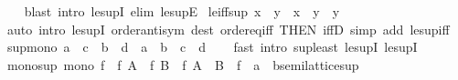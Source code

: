 \begin{isabellebody}
%
\isadelimproof
\ \ %
\endisadelimproof
%
\isatagproof
{}\isamarkupfalse%
\ {\isacharparenleft}{\kern0pt}blast\ intro{\isacharcolon}{\kern0pt}\ le{\isacharunderscore}{\kern0pt}supI\ elim{\isacharcolon}{\kern0pt}\ le{\isacharunderscore}{\kern0pt}supE{\isacharparenright}{\kern0pt}%
\endisatagproof
{\isafoldproof}%
%
\isadelimproof
\isanewline
%
\endisadelimproof
\isanewline
{}\isamarkupfalse%
\ le{\isacharunderscore}{\kern0pt}iff{\isacharunderscore}{\kern0pt}sup{\isacharcolon}{\kern0pt}\ {\isachardoublequoteopen}x\ {\isasymle}\ y\ {\isasymlongleftrightarrow}\ x\ {\isasymsqunion}\ y\ {\isacharequal}{\kern0pt}\ y{\isachardoublequoteclose}\isanewline
%
\isadelimproof
\ \ %
\endisadelimproof
%
\isatagproof
{}\isamarkupfalse%
\ {\isacharparenleft}{\kern0pt}auto\ intro{\isacharcolon}{\kern0pt}\ le{\isacharunderscore}{\kern0pt}supI{}\ order{\isachardot}{\kern0pt}antisym\ dest{\isacharcolon}{\kern0pt}\ order{\isachardot}{\kern0pt}eq{\isacharunderscore}{\kern0pt}iff\ {\isacharbrackleft}{\kern0pt}THEN\ iffD{}{\isacharbrackright}{\kern0pt}\ simp\ add{\isacharcolon}{\kern0pt}\ le{\isacharunderscore}{\kern0pt}sup{\isacharunderscore}{\kern0pt}iff{\isacharparenright}{\kern0pt}%
\endisatagproof
{\isafoldproof}%
%
\isadelimproof
\isanewline
%
\endisadelimproof
\isanewline
{}\isamarkupfalse%
\ sup{\isacharunderscore}{\kern0pt}mono{\isacharcolon}{\kern0pt}\ {\isachardoublequoteopen}a\ {\isasymle}\ c\ {\isasymLongrightarrow}\ b\ {\isasymle}\ d\ {\isasymLongrightarrow}\ a\ {\isasymsqunion}\ b\ {\isasymle}\ c\ {\isasymsqunion}\ d{\isachardoublequoteclose}\isanewline
%
\isadelimproof
\ \ %
\endisadelimproof
%
\isatagproof
{}\isamarkupfalse%
\ {\isacharparenleft}{\kern0pt}fast\ intro{\isacharcolon}{\kern0pt}\ sup{\isacharunderscore}{\kern0pt}least\ le{\isacharunderscore}{\kern0pt}supI{}\ le{\isacharunderscore}{\kern0pt}supI{}{\isacharparenright}{\kern0pt}%
\endisatagproof
{\isafoldproof}%
%
\isadelimproof
\isanewline
%
\endisadelimproof
\isanewline
{}\isamarkupfalse%
\ mono{\isacharunderscore}{\kern0pt}sup{\isacharcolon}{\kern0pt}\ {\isachardoublequoteopen}mono\ f\ {\isasymLongrightarrow}\ f\ A\ {\isasymsqunion}\ f\ B\ {\isasymle}\ f\ {\isacharparenleft}{\kern0pt}A\ {\isasymsqunion}\ B{\isacharparenright}{\kern0pt}{\isachardoublequoteclose}\ \ f\ {\isacharcolon}{\kern0pt}{\isacharcolon}{\kern0pt}\ {\isachardoublequoteopen}{\isacharprime}{\kern0pt}a\ {\isasymRightarrow}\ {\isacharprime}{\kern0pt}b{\isacharcolon}{\kern0pt}{\isacharcolon}{\kern0pt}semilattice{\isacharunderscore}{\kern0pt}sup{\isachardoublequoteclose}\isanewline

\end{isabellebody}
